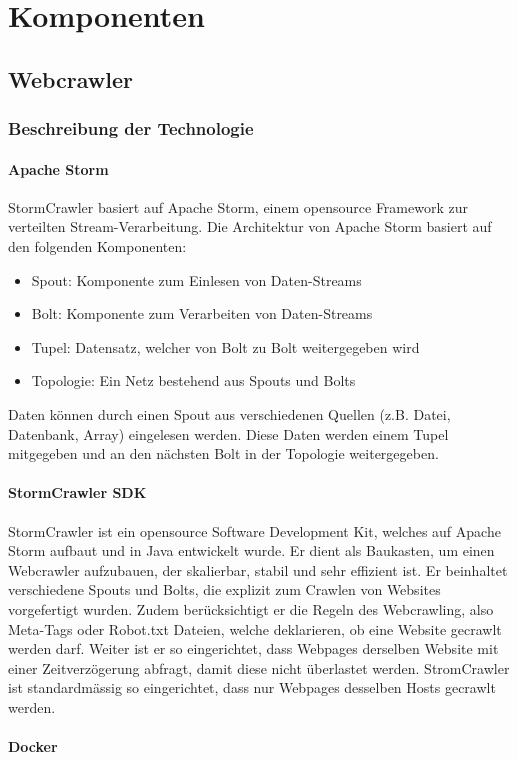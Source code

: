 \chapter{Komponenten}
\section{Webcrawler}
\subsection{Beschreibung der Technologie}
\subsubsection{Apache Storm}
StormCrawler basiert auf Apache Storm, einem opensource Framework zur verteilten Stream-Verarbeitung.
Die Architektur von Apache Storm basiert auf den folgenden Komponenten:
\begin{itemize}
	\item Spout: Komponente zum Einlesen von Daten-Streams
	\item Bolt: Komponente zum Verarbeiten von Daten-Streams
	\item Tupel: Datensatz, welcher von Bolt zu Bolt weitergegeben wird
	\item Topologie: Ein Netz bestehend aus Spouts und Bolts
\end{itemize}
Daten können durch einen Spout aus verschiedenen Quellen (z.B. Datei, Datenbank, Array) eingelesen werden.
Diese Daten werden einem Tupel mitgegeben und an den nächsten Bolt in der Topologie weitergegeben.
\subsubsection{StormCrawler SDK}
StormCrawler ist ein opensource Software Development Kit, welches auf Apache Storm aufbaut und in Java entwickelt wurde.
Er dient als Baukasten, um einen Webcrawler aufzubauen, der skalierbar, stabil und sehr effizient ist.
Er beinhaltet verschiedene Spouts und Bolts, die explizit zum Crawlen von Websites vorgefertigt wurden.
Zudem berücksichtigt er die Regeln des Webcrawling, also Meta-Tags oder Robot.txt Dateien, welche deklarieren, ob eine Website gecrawlt werden darf.
Weiter ist er so eingerichtet, dass Webpages derselben Website mit einer Zeitverzögerung abfragt, damit diese nicht überlastet werden.
StromCrawler ist standardmässig so eingerichtet, dass nur Webpages desselben Hosts gecrawlt werden.
\subsubsection{Docker}
